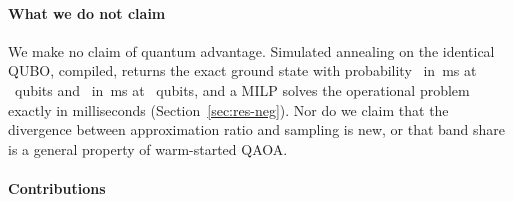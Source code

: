 \paragraph{What we do not claim} We make no claim of quantum advantage. Simulated annealing on the identical QUBO, compiled, returns the exact ground state with probability \SAPgndLtwoEFive\ in \SAmsLtwoEFive\,ms at \NLtwo\ qubits and \SAPgndLfourESix\ in \SAmsLfourESix\,ms at \NLfour\ qubits, and a MILP solves the operational problem exactly in milliseconds (Section~\ref{sec:res-neg}). Nor do we claim that the divergence between approximation ratio and sampling is new, or that band share is a general property of warm-started QAOA.

\paragraph{Contributions}
